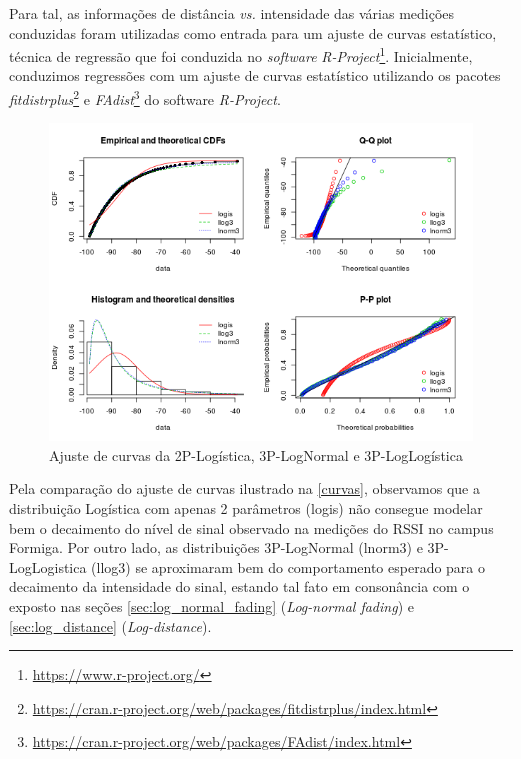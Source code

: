 \documentclass[
	12pt,				%
	twoside,			%
	a4paper,			%
	english,			%
	french,				%
	spanish,			%
	brazil				%
	]{abntex2}
\begin{document}
Para tal, as informações de distância \emph{vs.} intensidade das várias
medições conduzidas foram utilizadas como entrada para um ajuste de
curvas estatístico, técnica de regressão que foi conduzida no
\emph{software} \emph{R-Project}\footnote{\url{https://www.r-project.org/}}.
Inicialmente, conduzimos regressões com um ajuste de curvas estatístico
utilizando os pacotes \emph{fitdistrplus}\footnote{\url{https://cran.r-project.org/web/packages/fitdistrplus/index.html}}
e \emph{FAdist}\footnote{\url{https://cran.r-project.org/web/packages/FAdist/index.html}}
do software \emph{R-Project}.

\begin{figure}[htb]
    \caption{\label{curvas} Ajuste de curvas da 2P-Logística, 3P-LogNormal e 3P-LogLogística}
    \begin{center}
        \includegraphics[scale=0.8]{imagens/curvas.jpg}
    \end{center}
\end{figure}

Pela comparação do ajuste de curvas ilustrado na \autoref{curvas},
observamos que a distribuição Logística com apenas 2 parâmetros (logis)
não consegue modelar bem o decaimento do nível de sinal observado na
medições do RSSI no campus Formiga. Por outro lado, as distribuições
3P-LogNormal (lnorm3) e 3P-LogLogistica (llog3) se aproximaram bem do
comportamento esperado para o decaimento da intensidade do sinal,
estando tal fato em consonância com o exposto nas seções
\ref{sec:log_normal_fading} (\emph{Log-normal fading}) e
\ref{sec:log_distance} (\emph{Log-distance}).
\end{document}
